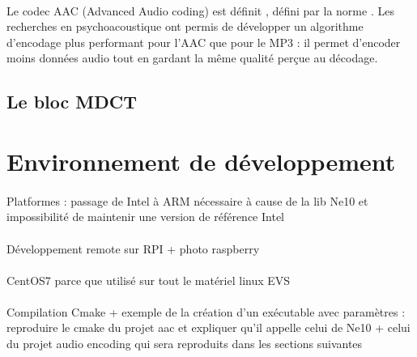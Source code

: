 \documentclass{article}
\begin{document}
    \paragraph{}
    Le codec AAC (Advanced Audio coding) est définit  , défini par la norme . Les recherches en psychoacoustique ont permis de développer un algorithme d'encodage plus performant pour l'AAC que pour le MP3 : il permet d'encoder moins données audio tout en gardant la même qualité perçue au décodage\cite{1999-Brandenburg}.



    \subsection{Le bloc MDCT}


    \newpage
    \section{Environnement de développement}
    \paragraph{}
    Platformes : passage de Intel à ARM nécessaire à cause de la lib Ne10 et impossibilité de maintenir une version de référence Intel

    \paragraph{}
    Développement remote sur RPI + photo raspberry

    \paragraph{}
    CentOS7 parce que utilisé sur tout le matériel linux EVS

    \paragraph{}
    Compilation Cmake + exemple de la création d'un exécutable avec paramètres : reproduire le cmake du projet aac et expliquer qu'il appelle celui de Ne10 + celui du projet audio encoding qui sera reproduits dans les sections suivantes
\end{document}
